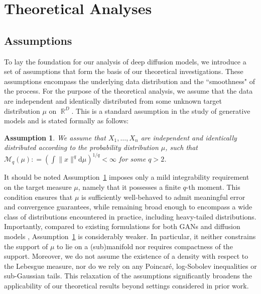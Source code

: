 \documentclass[12pts]{article}
\newtheorem{ass}{Assumption}
\def\Real{\mathop{\mathbb{R}}\nolimits}
\newcommand{\diff}{\mathrm{d}}
\newcommand{\sM}{ \mathscr{M}}
\begin{document}
\section{Theoretical Analyses}
\label{theo_ana}

  \subsection{Assumptions}\label{sec_assumptions}
  To lay the foundation for our analysis of deep diffusion models, we introduce a set of assumptions that form the basis of our theoretical investigations. These assumptions encompass the underlying data distribution and the ``smoothness" of the process.  For the purpose of the theoretical analysis, we assume that the data are independent and identically distributed from some unknown target distribution $\mu$ on $\Real^D$. This is a standard assumption in the study of generative models \citep{liang2021well, JMLR:v23:21-0732, JMLR:v26:24-0054,pmlr-v238-tang24a,oko2023diffusion} and is stated formally as follows:

\begin{ass}
    \label{a2}
    We assume that $X_1, \dots, X_n$ are independent and identically distributed according to the probability distribution $\mu$, such that $\sM_q (\mu) : = \left(\int \|x\|^q \diff \mu\right)^{1/q} < \infty$ for some $q > 2$.
\end{ass}
It should be noted Assumption~\ref{a2} imposes only a mild integrability requirement on the target measure $\mu$, namely that it possesses a finite $q$-th moment. This condition ensures that $\mu$ is sufficiently well-behaved to admit meaningful error and convergence guarantees, while remaining broad enough to encompass a wide class of distributions encountered in practice, including heavy-tailed distributions. Importantly, compared to existing formulations for both GANs \citep{liang2021well, JMLR:v23:21-0732, JMLR:v26:24-0054} and diffusion models \citep{pmlr-v238-tang24a,oko2023diffusion}, Assumption~\ref{a2} is considerably weaker. In particular, it neither constrains the support of $\mu$ to lie on a (sub)manifold nor requires compactness of the support. Moreover, we do not assume the existence of a density with respect to the Lebesgue measure, nor do we rely on any Poincaré, log-Sobolev inequalities or sub-Gaussian tails. This relaxation of the assumptions significantly broadens the applicability of our theoretical results beyond settings considered in prior work.
\end{document}
